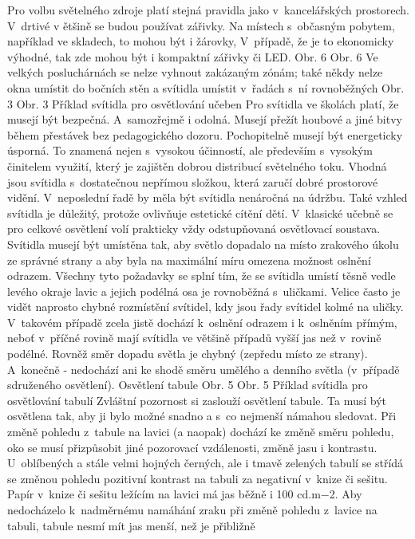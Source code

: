 Pro volbu světelného zdroje platí stejná pravidla jako v~kancelářských prostorech. V~drtivé v
ětšině se budou používat zářivky. Na místech s~občasným pobytem, například ve skladech, to mohou být
i žárovky, V~případě, že je to ekonomicky výhodné, tak zde mohou být i kompaktní zářivky či LED.
Obr. 6
Obr. 6 Ve velkých posluchárnách se nelze vyhnout zakázaným zónám; také někdy nelze okna umístit
do bočních stěn a svítidla umístit v~řadách s~ní rovnoběžných
Obr. 3
Obr. 3 Příklad svítidla pro osvětlování učeben
\medskip
Pro svítidla ve školách platí, že musejí být bezpečná. A~samozřejmě i odolná. Musejí přežít houbové
a jiné bitvy během přestávek bez pedagogického dozoru. Pochopitelně musejí být energeticky úsporná.
To znamená nejen s~vysokou účinností, ale především s~vysokým činitelem využití, který je zajištěn
dobrou distribucí světelného toku. Vhodná jsou svítidla s~dostatečnou nepřímou složkou, která zaručí
dobré prostorové vidění. V~neposlední řadě by měla být svítidla nenáročná na údržbu.
Také vzhled svítidla je důležitý, protože ovlivňuje estetické cítění dětí.
\medskip
V~klasické učebně se pro celkové osvětlení volí prakticky vždy odstupňovaná osvětlovací soustava.
Svítidla musejí být umístěna tak, aby světlo dopadalo na místo zrakového úkolu ze správné strany
a aby byla na maximální míru omezena možnost oslnění odrazem. Všechny tyto požadavky se splní tím,
že se svítidla umístí těsně vedle levého okraje lavic a jejich podélná osa je rovnoběžná s~uličkami.
Velice často je vidět naprosto chybné rozmístění svítidel, kdy jsou řady svítidel kolmé na uličky.
V~takovém případě zcela jistě dochází k~oslnění odrazem i k~oslněním přímým, neboť v~příčné rovině mají
svítidla ve většině případů vyšší jas než v~rovině podélné. Rovněž směr dopadu světla je chybný
(zepředu místo ze strany). A~konečně - nedochází ani ke shodě směru umělého a denního světla (v~případě sdruženého osvětlení).
Osvětlení tabule
Obr. 5
Obr. 5 Příklad svítidla pro osvětlování tabulí
\medskip
Zvláštní pozornost si zaslouží osvětlení tabule. Ta musí být osvětlena tak, aby ji bylo možné snadno
a s~co nejmenší námahou sledovat. Při změně pohledu z~tabule na lavici (a naopak) dochází ke změně směru
pohledu, oko se musí přizpůsobit jiné pozorovací vzdálenosti, změně jasu i kontrastu. U~oblíbených a stále
velmi hojných černých, ale i tmavě zelených tabulí se střídá se změnou pohledu pozitivní kontrast
na tabuli za negativní v~knize či sešitu.
\medskip
Papír v~knize či sešitu ležícím na lavici má jas běžně i 100 cd.m−2. Aby nedocházelo k~nadměrnému
namáhání zraku při změně pohledu z~lavice na tabuli, tabule nesmí mít jas menší, než je přibližně
